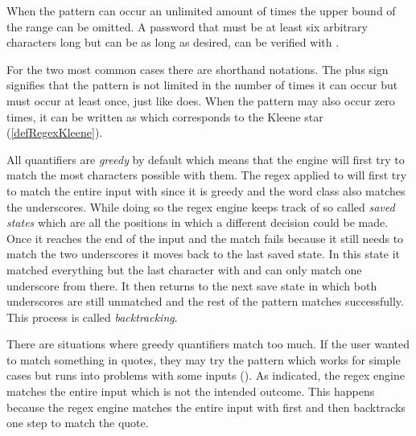 When the pattern can occur an unlimited amount of times the upper bound of the range can be omitted. A password that must be at least six arbitrary characters long but can be as long as desired, can be verified with . 

For the two most common cases there are shorthand notations. The plus sign \pattern{\placeholder+} signifies that the pattern is not limited in the number of times it can occur but must occur at least once, just like  does. When the pattern may also occur zero times, it can be written as \pattern{\placeholder*} which corresponds to the Kleene star (\ref{defRegexKleene}).

All quantifiers are \emph{greedy} by default which means that the engine will first try to match the most characters possible with them. The regex  applied to  will first try to match the entire input with  since it is greedy and the word class also matches the underscores. While doing so the regex engine keeps track of so called \emph{saved states} which are all the positions in which a different decision could be made. Once it reaches the end of the input and the match fails because it still needs to match the two underscores it moves back to the last saved state. In this state it matched everything but the last character with  and can only match one underscore from there. It then returns to the next save state in which both underscores are still unmatched and the rest of the pattern matches successfully. This process is called \emph{backtracking}. 


There are situations where greedy quantifiers match too much. If the user wanted to match something in quotes, they may try the pattern  which works for simple cases but runs into problems with some inputs (). As indicated, the regex engine matches the entire input which is not the intended outcome. This happens because the regex engine matches the entire input with  first and then backtracks one step to match the quote.

\begin{listingBoxFigure}[title={Too greedy quantifier in \pattern{".*"}},label=fig:regexSurroundingTooGreedy,width=12cm,center]
    \hspace{-5mm}
\end{listingBoxFigure}

